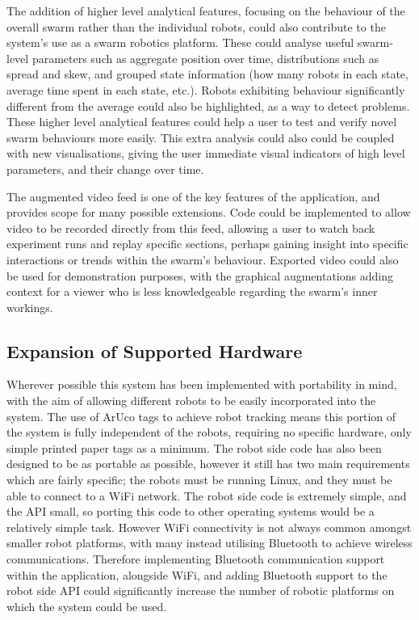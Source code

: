 The addition of higher level analytical features, focusing on the behaviour of the overall swarm rather than the individual robots, could also contribute to the system's use as a swarm robotics platform. These could analyse useful swarm-level parameters such as aggregate position over time, distributions such as spread and skew, and grouped state information (how many robots in each state, average time spent in each state, etc.). Robots exhibiting behaviour significantly different from the average could also be highlighted, as a way to detect problems. These higher level analytical features could help a user to test and verify novel swarm behaviours more easily. This extra analysis could also could be coupled with new visualisations, giving the user immediate visual indicators of high level parameters, and their change over time.

The augmented video feed is one of the key features of the application, and provides scope for many possible extensions. Code could be implemented to allow video to be recorded directly from this feed, allowing a user to watch back experiment runs and replay specific sections, perhaps gaining insight into specific interactions or trends within the swarm's behaviour. Exported video could also be used for demonstration purposes, with the graphical augmentations adding context for a viewer who is less knowledgeable regarding the swarm's inner workings.


\subsection{Expansion of Supported Hardware} \label{HardwareExpansion}

Wherever possible this system has been implemented with portability in mind, with the aim of allowing different robots to be easily incorporated into the system. The use of ArUco tags to achieve robot tracking means this portion of the system is fully independent of the robots, requiring no specific hardware, only simple printed paper tags as a minimum. The robot side code has also been designed to be as portable as possible, however it still has two main requirements which are fairly specific; the robots must be running Linux, and they must be able to connect to a WiFi network. The robot side code is extremely simple, and the API small, so porting this code to other operating systems would be a relatively simple task. However WiFi connectivity is not always common amongst smaller robot platforms, with many instead utilising Bluetooth to achieve wireless communications. Therefore implementing Bluetooth communication support within the application, alongside WiFi, and adding Bluetooth support to the robot side API could significantly increase the number of robotic platforms on which the system could be used.

